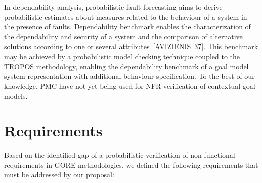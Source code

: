 In dependability analysis, probabilistic fault-forecasting aims to derive probabilistic estimates about measures related to the behaviour of a system in the presence of faults. Dependability benchmark enables the characterization of the dependability and security of a system and the comparison of alternative solutions according to one or several attributes~[AVIZIENIS~37]. This benchmark may be achieved by a probabilistic model checking technique coupled to the TROPOS methodology, enabling the dependability benchmark of a goal model system representation with additional behaviour specification. To the best of our knowledge, PMC have not yet being used for NFR verification of contextual goal models.


\section{Requirements}

Based on the identified gap of a probabilistic verification of non-functional requirements in GORE methodologies, we defined the following requirements that must be addressed by our proposal:


